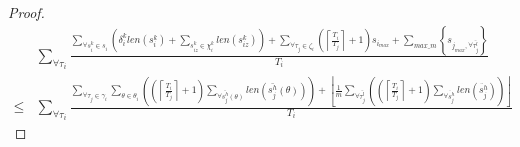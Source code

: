 \documentclass[prodmode,acmtecs]{acmsmall}
\begin{document}
\begin{compactenum}
\begin{proof}
\begin{eqnarray}
 & \sum_{\forall\tau_{i}}\frac{\sum_{\forall s_{i}^{k}\in s_{i}}\left(\delta_{i}^{k}len(s_{i}^{k})+\sum_{s_{iz}^{k}\in\chi_{i}^{k}}len(s_{iz}^{k})\right)+\sum_{\forall\tau_{j}\in\zeta_{i}}\left(\left\lceil \frac{T_{i}}{T_{j}}\right\rceil +1\right)s_{i_{max}}+\sum_{max\_m}\left\{ s_{j_{max},\forall\bar{\tau_{j}^{l}}}\right\} }{T_{i}}\label{eq:fblt_pnf_comparison_1}\\
\le & \sum_{\forall\tau_{i}}\frac{\sum_{\forall\tau_{j}\in\gamma_{i}}\sum_{\theta\in\theta_{i}}\left(\left(\left\lceil \frac{T_{i}}{T_{j}}\right\rceil +1\right)\sum_{\forall\bar{s_{j}^{h}}(\theta)}len\left(\bar{s_{j}^{h}}(\theta)\right)\right)+\left\lfloor \frac{1}{m}\sum_{\forall\bar{\tau_{j}^{l}}}\left(\left(\left\lceil \frac{T_{i}}{T_{j}}\right\rceil +1\right)\sum_{\forall\ddot{s_{j}^{h}}}len\left(\ddot{s_{j}^{h}}\right)\right)\right\rfloor }{T_{i}}\nonumber 
\end{eqnarray}



\end{proof}
\end{compactenum}
\end{document}
